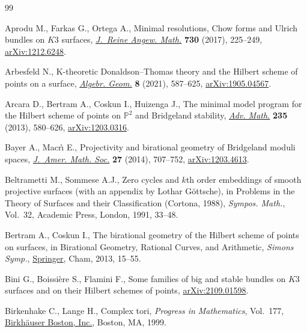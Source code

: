 \begin{thebibliography}{99}
\footnotesize\itemsep=0pt


Aprodu M., Farkas G., Ortega A., Minimal resolutions, {C}how forms and {U}lrich
 bundles on {$K3$} surfaces, \href{https://doi.org/10.1515/crelle-2014-0124}{\textit{J.~Reine Angew. Math.}} \textbf{730}
 (2017), 225--249, \href{https://arxiv.org/abs/1212.6248}{arXiv:1212.6248}.

Arbesfeld N., K-theoretic {D}onaldson--{T}homas theory and the {H}ilbert scheme
 of points on a surface, \href{https://doi.org/10.14231/ag-2021-018}{\textit{Algebr. Geom.}} \textbf{8} (2021), 587--625,
 \href{https://arxiv.org/abs/1905.04567}{arXiv:1905.04567}.

Arcara D., Bertram A., Coskun I., Huizenga J., The minimal model program for
 the {H}ilbert scheme of points on {$\mathbb{P}^2$} and {B}ridgeland
 stability, \href{https://doi.org/10.1016/j.aim.2012.11.018}{\textit{Adv. Math.}} \textbf{235} (2013), 580--626,
 \href{https://arxiv.org/abs/1203.0316}{arXiv:1203.0316}.

Bayer A., Macr\`{\i} E., Projectivity and birational geometry of {B}ridgeland
 moduli spaces, \href{https://doi.org/10.1090/S0894-0347-2014-00790-6}{\textit{J.~Amer. Math. Soc.}} \textbf{27} (2014), 707--752,
 \href{https://arxiv.org/abs/1203.4613}{arXiv:1203.4613}.

Beltrametti M., Sommese A.J., Zero cycles and {$k$}th order embeddings of
 smooth projective surfaces (with an appendix by Lothar G\"ottsche), in
 Problems in the Theory of Surfaces and their Classification ({C}ortona,
 1988), \textit{Sympos. Math.}, Vol.~32, Academic Press, London, 1991, 33--48.

Bertram A., Coskun I., The birational geometry of the {H}ilbert scheme of
 points on surfaces, in Birational Geometry, Rational Curves, and Arithmetic,
 \textit{Simons Symp.}, \href{https://doi.org/10.1007/978-1-4614-6482-2_2}{Springer}, Cham, 2013, 15--55.

Bini G., Boissi\`ere S., Flamini F., Some families of big and stable bundles on
 $K3$ surfaces and on their Hilbert schemes of points, \href{https://arxiv.org/abs/2109.01598}{arXiv:2109.01598}.

Birkenhake C., Lange H., Complex tori, \textit{Progress in Mathematics}, Vol.~177, \href{https://doi.org/10.1007/978-1-4612-1566-0}{Birkh\"auser Boston, Inc.}, Boston, MA, 1999.


\end{thebibliography}
